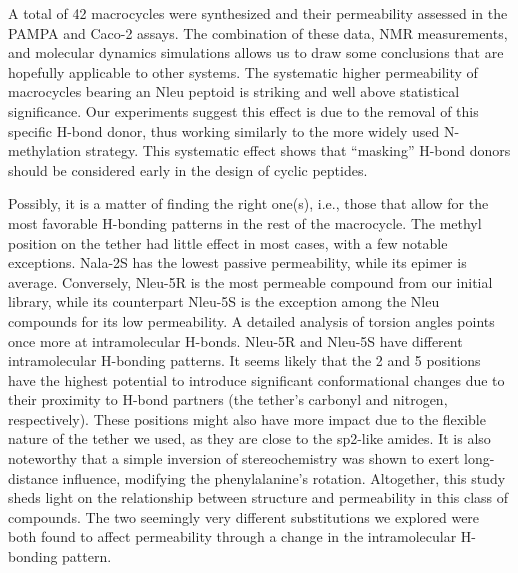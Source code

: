 A total of 42 macrocycles were synthesized and their permeability assessed in the PAMPA and Caco-2 assays. 
The combination of these data, NMR measurements, and molecular dynamics simulations allows us to draw some conclusions that are hopefully applicable to other systems. 
The systematic higher permeability of macrocycles bearing an Nleu peptoid is striking and well above statistical significance. Our experiments suggest this effect is due to the removal of this specific H-bond donor, thus working similarly to the more widely used N-methylation strategy. 
This systematic effect shows that “masking” H-bond donors should be considered early in the design of cyclic peptides. 

Possibly, it is a matter of finding the right one(s), i.e., those that allow for the most favorable H-bonding patterns in the rest of the macrocycle.
The methyl position on the tether had little effect in most cases, with a few notable exceptions.
Nala-2S has the lowest passive permeability, while its epimer is average. 
Conversely, Nleu-5R is the most permeable compound from our initial library, while its counterpart Nleu-5S is the exception among the Nleu compounds for its low permeability. 
A detailed analysis of torsion angles points once more at intramolecular H-bonds. 
Nleu-5R and Nleu-5S have different intramolecular H-bonding patterns. 
It seems likely that the 2 and 5 positions have the highest potential to introduce significant conformational changes due to their proximity to H-bond partners (the tether’s carbonyl and nitrogen, respectively).
These positions might also have more impact due to the flexible nature of the tether we used, as they are close to the sp2-like amides.
It is also noteworthy that a simple inversion of stereochemistry was shown to exert long-distance influence, modifying the phenylalanine’s rotation.
Altogether, this study sheds light on the relationship between structure and permeability in this class of compounds.
The two seemingly very different substitutions we explored were both found to affect permeability through a change in the intramolecular H-bonding pattern.
